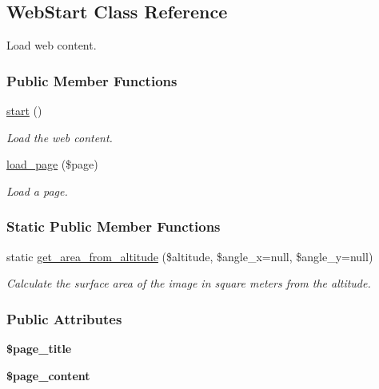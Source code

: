 \hypertarget{classWebStart}{\subsection{Web\-Start Class Reference}
\label{classWebStart}
}


Load web content.  


\subsubsection*{Public Member Functions}
\begin{DoxyCompactItemize}
\item 
\hypertarget{classWebStart_aab27910ba1dac86454076c3eb1bbfeef}{\hyperlink{classWebStart_aab27910ba1dac86454076c3eb1bbfeef}{start} ()}\label{classWebStart_aab27910ba1dac86454076c3eb1bbfeef}

\begin{DoxyCompactList}\small\item\em Load the web content. \end{DoxyCompactList}\item 
\hyperlink{classWebStart_aa86bafc7079b85cdd1051eeb392525b0}{load\-\_\-page} (\$page)
\begin{DoxyCompactList}\small\item\em Load a page. \end{DoxyCompactList}\end{DoxyCompactItemize}
\subsubsection*{Static Public Member Functions}
\begin{DoxyCompactItemize}
\item 
static \hyperlink{classWebStart_a0b7c4025f9e2528f567509b42ff91499}{get\-\_\-area\-\_\-from\-\_\-altitude} (\$altitude, \$angle\-\_\-x=null, \$angle\-\_\-y=null)
\begin{DoxyCompactList}\small\item\em Calculate the surface area of the image in square meters from the altitude. \end{DoxyCompactList}\end{DoxyCompactItemize}
\subsubsection*{Public Attributes}
\begin{DoxyCompactItemize}
\item 
\hypertarget{classWebStart_a440d4738eae58702e1c931e5bb7c0bdf}{{\bfseries \$page\-\_\-title}}\label{classWebStart_a440d4738eae58702e1c931e5bb7c0bdf}

\item 
\hypertarget{classWebStart_a8f40d903e95e1edf41bee61c889493de}{{\bfseries \$page\-\_\-content}}\label{classWebStart_a8f40d903e95e1edf41bee61c889493de}

\end{DoxyCompactItemize}
